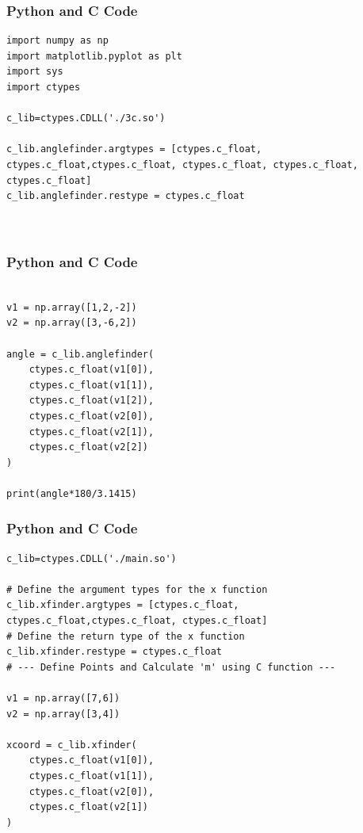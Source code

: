 \documentclass{beamer}
\begin{document}
\begin{frame}[fragile]
\frametitle{Python and C Code}

\begin{lstlisting}
import numpy as np
import matplotlib.pyplot as plt
import sys
import ctypes

c_lib=ctypes.CDLL('./3c.so')

c_lib.anglefinder.argtypes = [ctypes.c_float, ctypes.c_float,ctypes.c_float, ctypes.c_float, ctypes.c_float, ctypes.c_float]
c_lib.anglefinder.restype = ctypes.c_float



\end{lstlisting}

\end{frame}

\begin{frame}[fragile]
\frametitle{Python and C Code}
\begin{lstlisting}

v1 = np.array([1,2,-2])
v2 = np.array([3,-6,2])

angle = c_lib.anglefinder(
    ctypes.c_float(v1[0]),
    ctypes.c_float(v1[1]), 
    ctypes.c_float(v1[2]),
    ctypes.c_float(v2[0]), 
    ctypes.c_float(v2[1]),
    ctypes.c_float(v2[2])
)

print(angle*180/3.1415)

\end{lstlisting}

\end{frame}

\begin{frame}[fragile]
\frametitle{Python and C Code}

\begin{lstlisting}
c_lib=ctypes.CDLL('./main.so')

# Define the argument types for the x function
c_lib.xfinder.argtypes = [ctypes.c_float, ctypes.c_float,ctypes.c_float, ctypes.c_float]
# Define the return type of the x function
c_lib.xfinder.restype = ctypes.c_float
# --- Define Points and Calculate 'm' using C function ---

v1 = np.array([7,6])
v2 = np.array([3,4])

xcoord = c_lib.xfinder(
    ctypes.c_float(v1[0]),
    ctypes.c_float(v1[1]), 
    ctypes.c_float(v2[0]), 
    ctypes.c_float(v2[1])
)
\end{lstlisting}

\end{frame}
\end{document}
